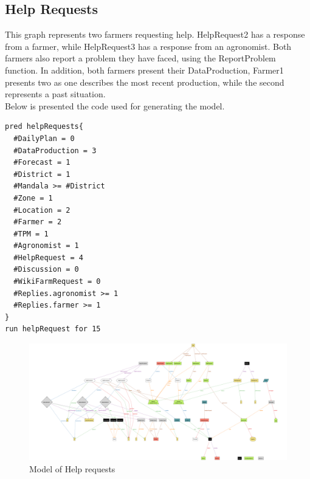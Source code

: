 \subsection{Help Requests}
This graph represents two farmers requesting help. HelpRequest2 has a response from a farmer, while HelpRequest3 has a response from an agronomist. Both farmers also report a problem they have faced, using the ReportProblem function. In addition, both farmers present their DataProduction, Farmer1 presents two as one describes the most recent production, while the second represents a past situation.\\
Below is presented the code used for generating the model.
\begin{lstlisting}[language=alloy]
pred helpRequests{
  #DailyPlan = 0
  #DataProduction = 3
  #Forecast = 1
  #District = 1
  #Mandala >= #District
  #Zone = 1
  #Location = 2
  #Farmer = 2
  #TPM = 1
  #Agronomist = 1
  #HelpRequest = 4
  #Discussion = 0
  #WikiFarmRequest = 0
  #Replies.agronomist >= 1
  #Replies.farmer >= 1
}
run helpRequest for 15
\end{lstlisting}
\begin{figure}[H]
\centering
	\includegraphics[angle=90,height=1.5\textwidth]{Images/Model/model2.png}
	\caption{Model of Help requests}
\end{figure}

